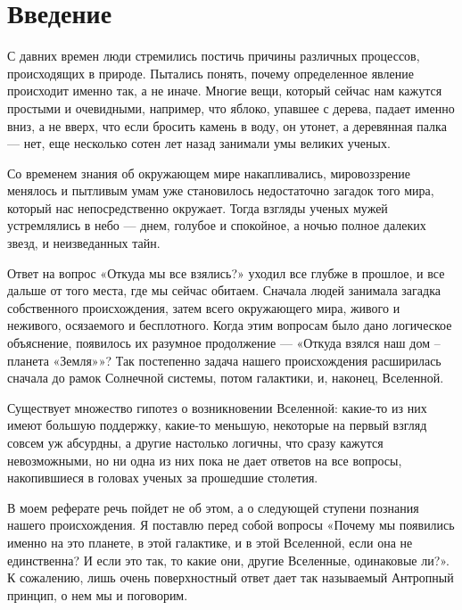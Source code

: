 \chapter*{Введение}							%

С давних времен люди стремились постичь причины различных процессов, происходящих в природе. Пытались понять, почему определенное явление происходит именно так, а не иначе. Многие вещи, который сейчас нам кажутся простыми и очевидными, например, что яблоко, упавшее с дерева, падает именно вниз, а не вверх, что если бросить камень в воду, он утонет, а деревянная палка --- нет, еще несколько сотен лет назад занимали умы великих ученых.


Со временем знания об окружающем мире накапливались, мировоззрение менялось и пытливым умам уже становилось недостаточно загадок того мира, который нас непосредственно окружает. Тогда взгляды ученых мужей устремлялись в небо --- днем, голубое и спокойное, а ночью полное далеких звезд, и неизведанных тайн.


Ответ на вопрос «Откуда мы все взялись?» уходил все глубже в прошлое, и все дальше от того места, где мы сейчас обитаем. Сначала людей занимала загадка собственного происхождения, затем всего окружающего мира, живого и неживого, осязаемого и бесплотного. Когда этим вопросам было дано логическое объяснение, появилось их разумное продолжение --- «Откуда взялся наш дом – планета «Земля»»? Так постепенно задача нашего происхождения расширилась сначала до рамок Солнечной системы, потом галактики, и, наконец, Вселенной.


Существует множество гипотез о возникновении Вселенной: какие-то из них имеют большую поддержку, какие-то меньшую, некоторые на первый взгляд совсем уж абсурдны, а другие настолько логичны, что сразу кажутся невозможными, но ни одна из них пока не дает ответов на все вопросы, накопившиеся в головах ученых за прошедшие столетия.


В моем реферате речь пойдет не об этом, а о следующей ступени познания нашего происхождения. Я поставлю перед собой вопросы «Почему мы появились именно на это планете, в этой галактике, и в этой Вселенной, если она не единственна? И если это так, то какие они, другие Вселенные, одинаковые ли?». К сожалению, лишь очень поверхностный ответ дает так называемый Антропный принцип, о нем мы и поговорим.







